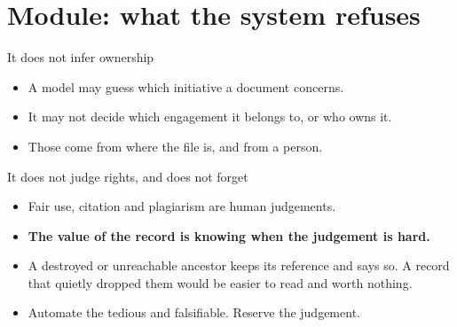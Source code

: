\documentclass[aspectratio=169,t]{beamer}
\begin{document}
\section{Module: what the system refuses}

\begin{frame}{It does not infer ownership}
    \begin{itemize}
        \item A model may guess which initiative a document concerns.
        \item It may not decide which engagement it belongs to, or who owns it.
        \item Those come from where the file is, and from a person.
    \end{itemize}
\end{frame}

\begin{frame}{It does not judge rights, and does not forget}
    \begin{itemize}
        \item Fair use, citation and plagiarism are human judgements.
        \item \textbf{The value of the record is knowing when the judgement is hard.}
        \item A destroyed or unreachable ancestor keeps its reference and says so.
              A record that quietly dropped them would be easier to read and worth
              nothing.
        \item Automate the tedious and falsifiable. Reserve the judgement.
    \end{itemize}
\end{frame}
\fi
\end{document}
